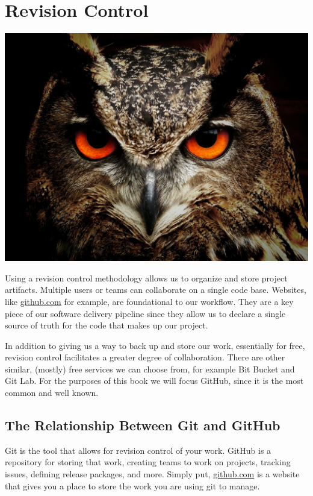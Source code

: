 \chapter{Revision Control}
\includegraphics[scale=0.20]{../images/owl-50267_1920.jpg}

\justify{}
Using a revision control methodology allows us to organize and store project artifacts. Multiple users or
teams can collaborate on a single code base. Websites, like \href{https://github.com}{github.com} for example, are foundational to our workflow. They are a key piece of 
our software delivery pipeline since they allow us to declare a single source of truth for the code that makes up our project.

\justify{}
In addition to giving us a way to back up and store our work, essentially for free, revision control facilitates a greater degree
of collaboration. There are other similar, (mostly) free services we can choose from, for example Bit Bucket and Git
Lab. For the purposes of this book we will focus GitHub, since it is the most common and well known.

\section{The Relationship Between Git and GitHub}

\justify{}
Git is the tool that allows for revision control of your work. GitHub is a repository for storing that work, creating teams to work on projects, tracking issues, defining release packages,
and more. Simply put, \href{github.com}{github.com} is a website that gives you a place to store the work you are using git to manage. 

